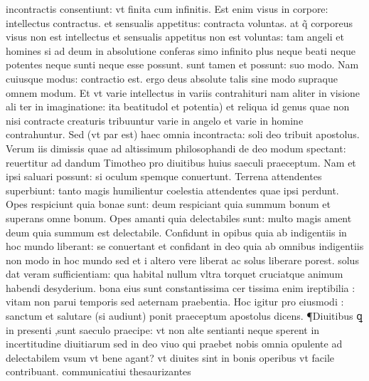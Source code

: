 \documentclass{article}
\begin{document}
\begin{pages}
incontractis consentiunt: vt finita cum infinitis. Est enim visus in corpore: intellectus contractus. et sensualis appetitus: contracta voluntas. at q̃ corporeus visus non est intellectus et sensualis appetitus non est voluntas: tam angeli et homines si ad deum in absolutione conferas simo infinito plus neque beati neque potentes neque sunti neque esse possunt. sunt tamen et possunt: suo modo. Nam cuiusque modus: contractio est. ergo deus absolute talis sine modo supraque  omnem modum. Et vt varie intellectus in variis contrahituri nam aliter in visione ali ter in imaginatione: ita beatitudol et potentia) et reliqua id genus quae non nisi contracte creaturis tribuuntur varie in angelo et varie in homine contrahuntur. Sed (vt par est) haec omnia incontracta: soli deo tribuit apostolus. Verum iis dimissis quae ad altissimum philosophandi de deo modum spectant: reuertitur ad dandum Timotheo pro diuitibus huius saeculi praeceptum. Nam et ipsi saluari possunt: si oculum spemque conuertunt. Terrena attendentes superbiunt: tanto magis humilientur coelestia attendentes quae ipsi perdunt. Opes respiciunt quia bonae sunt: deum respiciant quia summum bonum et superans omne bonum. Opes amanti quia delectabiles sunt: multo magis ament deum quia summum est delectabile. Confidunt in opibus quia ab indigentiis in hoc mundo liberant: se conuertant et confidant in deo quia ab omnibus indigentiis non modo in hoc mundo  sed et i altero vere liberat ac solus liberare porest. solus dat veram sufficientiam: qua habital nullum vltra torquet cruciatque animum habendi desyderium. bona eius sunt constantissima cer tissima enim ireptibilia : vitam non parui temporis sed aeternam praebentia. Hoc igitur pro eiusmodi : sanctum et salutare (si audiunt) ponit praeceptum apostolus dicens. ¶Diuitibus ꝗ in presenti ,sunt saeculo praecipe: vt non alte sentianti neque sperent in incertitudine diuitiarum sed in  deo viuo qui praebet nobis omnia opulente ad delectabilem vsum vt bene agant?  vt diuites sint in bonis operibus vt facile contribuant. communicatiui thesaurizantes  \pend

\end{pages}
\end{document}
